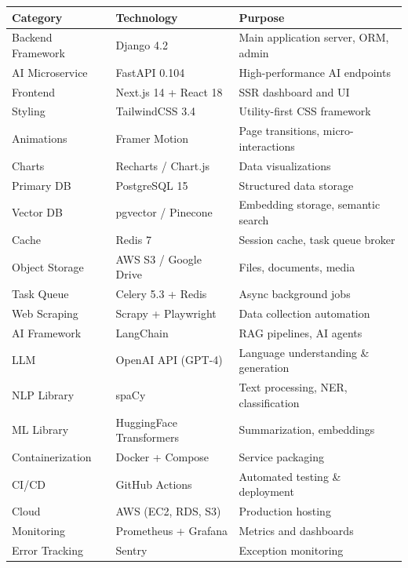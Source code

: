 \documentclass[12pt,a4paper]{report}
\begin{document}
\begin{center}
\begin{tabular}{lll}
\toprule
\textbf{Category} & \textbf{Technology} & \textbf{Purpose} \\
\midrule
Backend Framework   & Django 4.2            & Main application server, ORM, admin \\
AI Microservice     & FastAPI 0.104         & High-performance AI endpoints \\
Frontend            & Next.js 14 + React 18 & SSR dashboard and UI \\
Styling             & TailwindCSS 3.4       & Utility-first CSS framework \\
Animations          & Framer Motion         & Page transitions, micro-interactions \\
Charts              & Recharts / Chart.js   & Data visualizations \\
Primary DB          & PostgreSQL 15         & Structured data storage \\
Vector DB           & pgvector / Pinecone   & Embedding storage, semantic search \\
Cache               & Redis 7               & Session cache, task queue broker \\
Object Storage      & AWS S3 / Google Drive & Files, documents, media \\
Task Queue          & Celery 5.3 + Redis    & Async background jobs \\
Web Scraping        & Scrapy + Playwright   & Data collection automation \\
AI Framework        & LangChain             & RAG pipelines, AI agents \\
LLM                 & OpenAI API (GPT-4)    & Language understanding \& generation \\
NLP Library         & spaCy                 & Text processing, NER, classification \\
ML Library          & HuggingFace Transformers & Summarization, embeddings \\
Containerization    & Docker + Compose      & Service packaging \\
CI/CD               & GitHub Actions        & Automated testing \& deployment \\
Cloud               & AWS (EC2, RDS, S3)    & Production hosting \\
Monitoring          & Prometheus + Grafana  & Metrics and dashboards \\
Error Tracking      & Sentry                & Exception monitoring \\
\bottomrule
\end{tabular}
\end{center}
\end{document}
